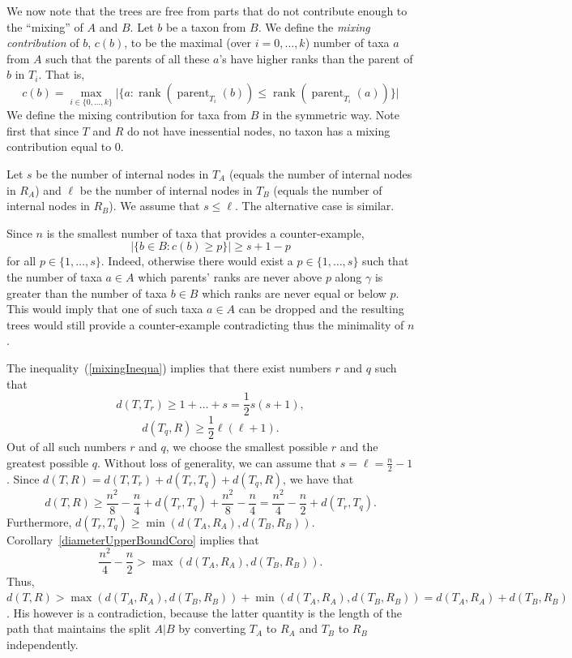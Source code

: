 \documentclass{amsart}
\theoremstyle{definition}
\begin{document}
We now note that the trees are free from parts that do not contribute enough to the ``mixing'' of $A$ and $B$.
Let $b$ be a taxon from $B$.
We define the {\em mixing contribution} of $b$, $c(b)$, to be the maximal (over $i = 0,\ldots,k$) number of taxa $a$ from $A$ such that the parents of all these $a$'s have higher ranks than the parent of $b$ in $T_i$.
That is,
\[
c(b) = \max\limits_{i \in \{0,\ldots,k\}} \Big| \big\{a : \operatorname{rank}(\operatorname{parent}_{T_i}(b)) \le \operatorname{rank}(\operatorname{parent}_{T_i}(a))\big\} \Big|
\]
We define the mixing contribution for taxa from $B$ in the symmetric way.
Note first that since $T$ and $R$ do not have inessential nodes, no taxon has a mixing contribution equal to $0$.

Let $s$ be the number of internal nodes in $T_A$ (equals the number of internal nodes in $R_A$) and $\ell$ be the number of internal nodes in $T_B$ (equals the number of internal nodes in $R_B$).
We assume that $s \le \ell$.
The alternative case is similar.

Since $n$ is the smallest number of taxa that provides a counter-example,
\[
\big|\{b \in B : c(b) \ge p\}\big| \ge s+1-p
\tag{$\star$}
\label{mixingInequa}
\]
for all $p \in \{1,\ldots,s\}$.
Indeed, otherwise there would exist a $p \in \{1,\ldots,s\}$ such that the number of taxa $a \in A$ which parents' ranks are never above $p$ along $\gamma$ is greater than the number of taxa $b \in B$ which ranks are never equal or below $p$.
This would imply that one of such taxa $a \in A$ can be dropped and the resulting trees would still provide a counter-example contradicting thus the minimality of $n$.

The inequality~(\ref{mixingInequa}) implies that there exist numbers $r$ and $q$ such that
\[
d(T, T_r) \ge 1 + \ldots + s = \frac 12 s (s+1),
\]
\[
d(T_q, R) \ge \frac 12 \ell (\ell + 1).
\]
Out of all such numbers $r$ and $q$, we choose the smallest possible $r$ and the greatest possible $q$.
Without loss of generality, we can assume that $s = \ell = \frac n2 - 1$.
Since $d(T,R) = d(T,T_r) + d(T_r,T_q) + d(T_q,R)$, we have that
\[
d(T,R) \ge \frac{n^2}{8} - \frac n4 + d(T_r, T_q) + \frac{n^2}{8} - \frac n4 = \frac{n^2}{4} - \frac n2 + d(T_r, T_q).
\]
Furthermore, $d(T_r, T_q) \ge \min(d(T_A, R_A), d(T_B, R_B))$.
Corollary~\ref{diameterUpperBoundCoro} implies that
\[
\frac{n^2}{4} - \frac n2 > \max(d(T_A, R_A), d(T_B, R_B)).
\]
Thus, $d(T, R) > \max(d(T_A, R_A), d(T_B, R_B)) + \min(d(T_A, R_A), d(T_B, R_B)) = d(T_A, R_A) + d(T_B, R_B)$.
His however is a contradiction, because the latter quantity is the length of the path that maintains the split $A|B$ by converting $T_A$ to $R_A$ and $T_B$ to $R_B$ independently.
\end{document}
